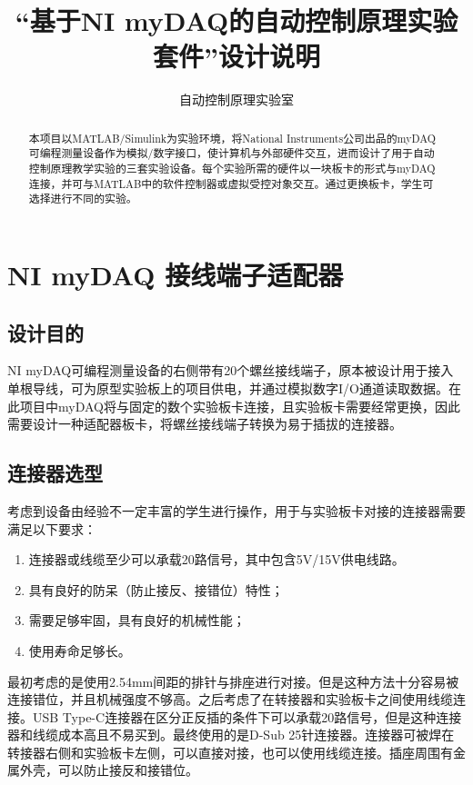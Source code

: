 \documentclass[11pt,a4paper]{article}
\title{``基于NI myDAQ的自动控制原理实验套件''设计说明}
\begin{document}
\author{自动控制原理实验室}

\maketitle

\begin{abstract}
  本项目以MATLAB/Simulink为实验环境，将National Instruments公司出品的myDAQ可编程测量设备作为模拟/数字接口，使计算机与外部硬件交互，进而设计了用于自动控制原理教学实验的三套实验设备。每个实验所需的硬件以一块板卡的形式与myDAQ连接，并可与MATLAB中的软件控制器或虚拟受控对象交互。通过更换板卡，学生可选择进行不同的实验。
\end{abstract}

\tableofcontents

\section{NI myDAQ 接线端子适配器}

\subsection{设计目的}
NI myDAQ可编程测量设备的右侧带有20个螺丝接线端子，原本被设计用于接入单根导线，可为原型实验板上的项目供电，并通过模拟数字I/O通道读取数据。在此项目中myDAQ将与固定的数个实验板卡连接，且实验板卡需要经常更换，因此需要设计一种适配器板卡，将螺丝接线端子转换为易于插拔的连接器。

\subsection{连接器选型}
考虑到设备由经验不一定丰富的学生进行操作，用于与实验板卡对接的连接器需要满足以下要求：
\begin{enumerate}
\item 连接器或线缆至少可以承载20路信号，其中包含5V/15V供电线路。
\item 具有良好的防呆（防止接反、接错位）特性；
\item 需要足够牢固，具有良好的机械性能；
\item 使用寿命足够长。
\end{enumerate}

最初考虑的是使用2.54mm间距的排针与排座进行对接。但是这种方法十分容易被连接错位，并且机械强度不够高。之后考虑了在转接器和实验板卡之间使用线缆连接。USB Type-C连接器在区分正反插的条件下可以承载20路信号，但是这种连接器和线缆成本高且不易买到。最终使用的是D-Sub 25针连接器。连接器可被焊在转接器右侧和实验板卡左侧，可以直接对接，也可以使用线缆连接。插座周围有金属外壳，可以防止接反和接错位。
\end{document}
